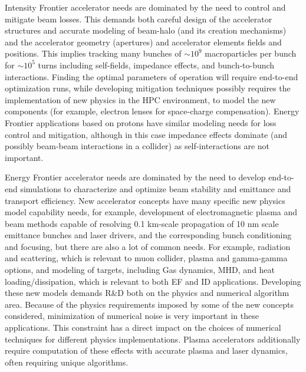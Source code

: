 Intensity Frontier accelerator needs are dominated by the need to
control and mitigate beam losses.  This demands both careful
design of the accelerator structures and accurate modeling of
beam-halo (and its creation mechanisms) and the accelerator
geometry (apertures) and accelerator elements fields and
positions.  This implies tracking many bunches of $\sim 10^9$
macroparticles per bunch for $\sim 10^5$ turns including
self-fields, impedance effects, and bunch-to-bunch interactions.
Finding the optimal parameters of operation will require
end-to-end  optimization runs, while developing mitigation
techniques possibly requires the implementation of new physics in the HPC
environment, to model the new components (for example, electron
lenses for space-charge compensation). Energy Frontier
applications based on protons have similar modeling needs for loss
control and mitigation, although in this case impedance effects
dominate (and possibly beam-beam interactions in a collider) as
self-interactions are not important.

Energy Frontier accelerator needs are dominated by the need to
develop end-to-end simulations to characterize and optimize beam
stability and emittance and transport efficiency.  New
accelerator concepts have many specific new physics model
capability needs, for example, development of electromagnetic
plasma and beam methods capable of resolving 0.1 km-scale
propagation of 10 nm scale emittance bunches and laser drivers,
and the corresponding bunch conditioning and focusing, but there
are also a lot of common needs.  For example, radiation and
scattering, which is relevant to muon collider, plasma and
gamma-gamma options, and modeling of targets,  including Gas
dynamics, MHD, and heat loading/dissipation,  which is relevant
to both EF and ID applications.  Developing these new models
demands R\&D both on the physics and numerical algorithm area.
Because of the physics requirements imposed by some of the new
concepts considered, minimization of numerical noise is very
important in these applications.  This constraint has a direct
impact on the choices of numerical techniques for different
physics implementations.  Plasma accelerators additionally require 
computation of these effects with accurate plasma and laser dynamics,
 often requiring unique algorithms.


